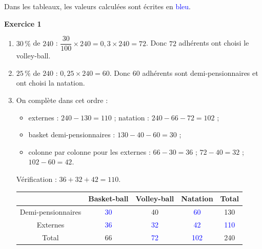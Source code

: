 \documentclass[a4paper,11pt]{article}
\newenvironment{exercice}[1]{%
  \Needspace{6\baselineskip}\par\bigskip\noindent\textbf{Exercice #1}\par\smallskip\noindent\ignorespaces
}{%
  \par
}
\newcommand{\val}[1]{\textcolor{blue}{#1}}
\begin{document}
\pagestyle{fancy}
\fancyhf{}
\fancyhead[L]{\Niveau}
\fancyhead[C]{\ChapitreCourt}
\fancyhead[R]{\Document}
\fancyfoot[R]{\thepage\ / \pageref{LastPage}}

Dans les tableaux, les valeurs calculées sont écrites en \val{bleu}.

\begin{exercice}{1}
\begin{enumerate}[label=\arabic*.]
\item $30\,\%$ de $240$ : $\dfrac{30}{100}\times 240 = 0{,}3\times 240 = 72$. Donc $72$ adhérents ont choisi le volley-ball.
\item $25\,\%$ de $240$ : $0{,}25\times 240 = 60$. Donc $60$ adhérents sont demi-pensionnaires et ont choisi la natation.
\item On complète dans cet ordre :
\begin{itemize}[label=$\bullet$]
\item externes : $240-130=110$ ; natation : $240-66-72=102$ ;
\item basket demi-pensionnaires : $130-40-60=30$ ;
\item colonne par colonne pour les externes : $66-30=36$ ; $72-40=32$ ; $102-60=42$.
\end{itemize}
Vérification : $36+32+42=110$.

\begin{center}
\begin{tabular}{|c|c|c|c|c|}
\hline
 & Basket-ball & Volley-ball & Natation & Total \\ \hline
Demi-pensionnaires & \val{30} & 40 & \val{60} & 130 \\ \hline
Externes & \val{36} & \val{32} & \val{42} & \val{110} \\ \hline
Total & 66 & \val{72} & \val{102} & 240 \\ \hline
\end{tabular}
\end{center}
\end{enumerate}
\end{exercice}
\end{document}
